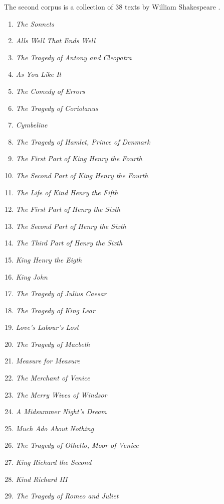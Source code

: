 The second corpus is a collection of 38 texts by William Shakespeare \autocite*{Shakespeare2011}.

\begin{enumerate}
  \item \textit{The Sonnets}
  \item \textit{Alls Well That Ends Well}
  \item \textit{The Tragedy of Antony and Cleopatra}
  \item \textit{As You Like It}
  \item \textit{The Comedy of Errors}
  \item \textit{The Tragedy of Coriolanus}
  \item \textit{Cymbeline}
  \item \textit{The Tragedy of Hamlet, Prince of Denmark}
  \item \textit{The First Part of King Henry the Fourth}
  \item \textit{The Second Part of King Henry the Fourth}
  \item \textit{The Life of Kind Henry the Fifth}
  \item \textit{The First Part of Henry the Sixth}
  \item \textit{The Second Part of Henry the Sixth}
  \item \textit{The Third Part of Henry the Sixth}
  \item \textit{King Henry the Eigth}
  \item \textit{King John}
  \item \textit{The Tragedy of Julius Caesar}
  \item \textit{The Tragedy of King Lear}
  \item \textit{Love's Labour's Lost}
  \item \textit{The Tragedy of Macbeth}
  \item \textit{Measure for Measure}
  \item \textit{The Merchant of Venice}
  \item \textit{The Merry Wives of Windsor}
  \item \textit{A Midsummer Night's Dream}
  \item \textit{Much Ado About Nothing}
  \item \textit{The Tragedy of Othello, Moor of Venice}
  \item \textit{King Richard the Second}
  \item \textit{Kind Richard III}
  \item \textit{The Tragedy of Romeo and Juliet}

\end{enumerate}
